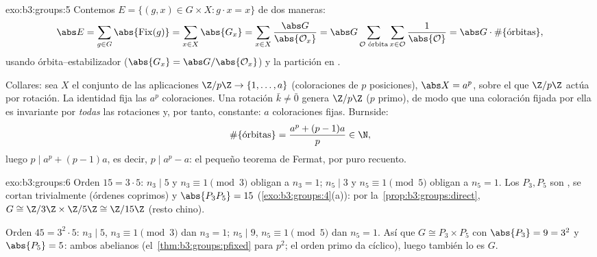 \begin{solution}{exo:b3:groups:5}
Contemos $E = \{(g,x) \in G \times X : g \cdot x = x\}$ de dos maneras:
\[
\abs E = \sum_{g \in G} \abs{\operatorname{Fix}(g)}
= \sum_{x \in X} \abs{G_x}
= \sum_{x \in X} \frac{\abs G}{\abs{\mathcal O_x}}
= \abs G \sum_{\mathcal O \text{ órbita}} \sum_{x \in \mathcal O}
\frac{1}{\abs{\mathcal O}}
= \abs G \cdot \#\{\text{órbitas}\},
\]
usando órbita--estabilizador ($\abs{G_x} = \abs G/\abs{\mathcal O_x}$) y
la partición en .

Collares: sea $X$ el conjunto de las aplicaciones $\Z/p\Z \to
\{1, \dots, a\}$ (coloraciones de $p$ posiciones), $\abs X = a^p$, sobre
el que $\Z/p\Z$ actúa por rotación. La identidad fija las $a^p$
coloraciones. Una rotación $\bar k \neq \bar 0$ genera $\Z/p\Z$ ($p$
primo), de modo que una coloración fijada por ella es invariante por
\emph{todas} las rotaciones y, por tanto, constante: $a$ coloraciones
fijas. Burnside:
\[
\#\{\text{órbitas}\} = \frac{a^p + (p-1)a}{p} \in \N ,
\]
luego $p \mid a^p + (p-1)a$, es decir, $p \mid a^p - a$: el pequeño
teorema de Fermat, por puro recuento.
\end{solution}

\begin{solution}{exo:b3:groups:6}
Orden $15 = 3 \cdot 5$: $n_3 \mid 5$ y $n_3 \equiv 1 \pmod 3$ obligan a
$n_3 = 1$; $n_5 \mid 3$ y $n_5 \equiv 1 \pmod 5$ obligan a $n_5 = 1$.
Los  $P_3, P_5$ son
, se cortan trivialmente (órdenes
coprimos) y $\abs{P_3P_5} = 15$ (\cref{exo:b3:groups:4}(a)): por
la~\cref{prop:b3:groups:direct}, $G
\cong \Z/3\Z \times \Z/5\Z \cong \Z/15\Z$ (resto chino).

Orden $45 = 3^2 \cdot 5$: $n_3 \mid 5$, $n_3 \equiv 1 \pmod 3$ dan
$n_3 = 1$; $n_5 \mid 9$, $n_5 \equiv 1 \pmod 5$ dan $n_5 =
1$. Así que $G \cong P_3 \times P_5$ con $\abs{P_3} = 9 = 3^2$ y
$\abs{P_5} = 5$: ambos abelianos (el~\cref{thm:b3:groups:pfixed} para
$p^2$; el orden primo da cíclico), luego también lo es $G$.
\end{solution}

